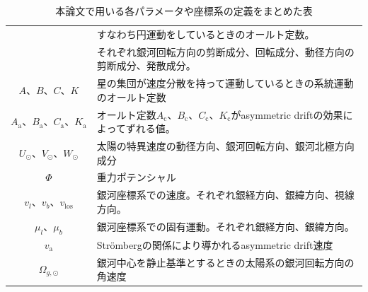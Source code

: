 \begin{table}
\begin{center}
\begin{tabular}{c|l}
    & すなわち円運動をしているときのオールト定数。\\
    & それぞれ銀河回転方向の剪断成分、回転成分、動径方向の剪断成分、発散成分。 \tabularnewline[\doublerulesep] 
 \hline
 $A、B、C、K$ & 星の集団が速度分散を持って運動しているときの系統運動のオールト定数\\
 \hline
 $A_{\mathrm{a}}、B_{\mathrm{a}}、C_{\mathrm{a}}、K_{\mathrm{a}}$ & オールト定数$A_{\mathrm{c}}、B_{\mathrm{c}}、C_{\mathrm{c}}、K_{\mathrm{c}}$がasymmetric driftの効果によってずれる値。\\
 \hline
 $U_{\odot}、V_{\odot}、W_{\odot}$ & 太陽の特異速度の動径方向、銀河回転方向、銀河北極方向成分\\
 \hline
 $\Phi$ & 重力ポテンシャル\\
 \hline
 $v_l、v_b、v_{\mathrm{los}}$ & 銀河座標系での速度。それぞれ銀経方向、銀緯方向、視線方向。\\
 \hline
 $\mu_l、\mu_b$ & 銀河座標系での固有運動。それぞれ銀経方向、銀緯方向。\\
 \hline
 $v_{\mathrm{a}}$ & Str\"{o}mbergの関係により導かれるasymmetric drift速度\\
 \hline
 $\Omega_{g,\odot}$ & 銀河中心を静止基準とするときの太陽系の銀河回転方向の角速度\\
 \hline
\end{tabular} \label{notation}
\vspace{3mm}
\caption{本論文で用いる各パラメータや座標系の定義をまとめた表}
\end{center}
\end{table}

